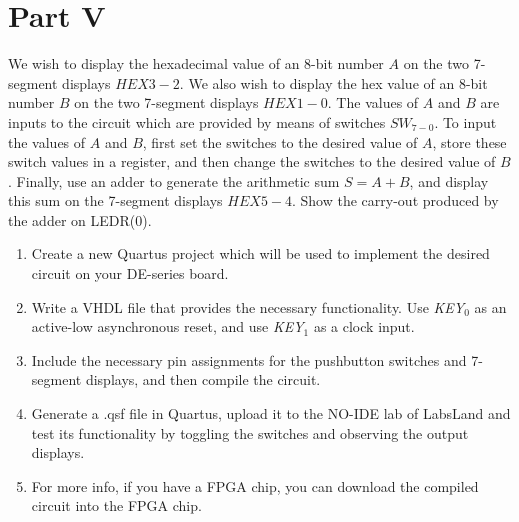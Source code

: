 \documentclass[epsfig,10pt,fullpage]{article}
\newcommand{\CommonDocsPath}{../../../common/docs}
\begin{document}
\section*{Part V}
We wish to display the hexadecimal value of an 8-bit number $A$
on the two 7-segment displays $HEX3-2$.  We also wish to display the
hex value of an 8-bit number $B$ on the two 7-segment displays $HEX1-0$. 
The values of $A$ and $B$ are inputs to the circuit which are
provided by means of switches $SW_{7-0}$.  To input the values of $A$ and $B$, 
first set the switches to the desired value of $A$, store these switch values in a register, 
and then change the switches to the desired value of $B$.  Finally, use an adder to 
generate the arithmetic sum $S = A + B$, and display this sum on the 7-segment 
displays $HEX5-4$. Show the carry-out produced by the adder on LEDR(0).
\begin{enumerate}
\item Create a new Quartus project which will be used to implement the desired
circuit on your DE-series board.
\item Write a VHDL file that provides the necessary functionality. Use {\it KEY}$_0$ as
an active-low asynchronous reset, and use {\it KEY}$_1$ as a clock input.
\item Include the necessary pin assignments for the pushbutton switches and 7-segment
displays, and then compile the circuit.
\item Generate a .qsf file in Quartus, upload it to the NO-IDE lab of LabsLand and test its functionality 
by toggling the switches and observing the output displays.
\item For more info, if you have a FPGA chip, you can download the compiled circuit into the FPGA chip.
\end{enumerate}




\end{document}
